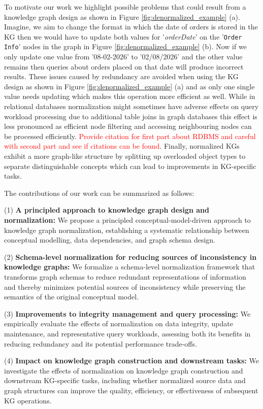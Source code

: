 \documentclass[sigconf]{acmart}
\begin{document}
To motivate our work we highlight possible problems that could result from a knowledge graph design as shown in Figure \ref{fig:denormalized_example} (a). Imagine, we aim to change the format in which the date of orders is stored in the KG then we would have to update both values for '\emph{orderDate}' on the '\texttt{Order Info}' nodes in the graph in Figure \ref{fig:denormalized_example} (b). Now if we only update one value from '08-02-2026' to '02/08/2026' and the other value  remains then queries about orders placed on that date will produce incorrect results. These issues caused by redundancy are avoided when using the KG design as shown in Figure \ref{fig:denormalized_example} (a) and as only one single value needs updating which makes this operation more efficient as well. While in relational databases normalization might sometimes have adverse effects on query workload processing due to additional table joins in graph databases this effect is less pronounced as efficient node filtering and accessing neighbouring nodes can be processed efficiently. \textcolor{red}{Provide citation for first part about RDBMS and careful with second part and see if citations can be found}. Finally, normalized KGs exhibit a more graph-like structure by splitting up overloaded object types to separate distinguishable concepts which can lead to improvements in KG-specific tasks.


The contributions of our work can be summarized as follows:

(1) \textbf{A principled approach to knowledge graph design and normalization:} We propose a principled conceptual-model-driven approach to knowledge graph normalization, establishing a systematic relationship between conceptual modelling, data dependencies, and graph schema design.

(2) \textbf{Schema-level normalization for reducing sources of inconsistency in knowledge graphs:} We formalize a schema-level normalization framework that transforms graph schemas to reduce redundant representations of information and thereby minimizes potential sources of inconsistency while preserving the semantics of the original conceptual model.

(3) \textbf{Improvements to integrity management and query processing:} We empirically evaluate the effects of normalization on data integrity, update maintenance, and representative query workloads, assessing both its benefits in reducing redundancy and its potential performance trade-offs.

(4) \textbf{Impact on knowledge graph construction and downstream tasks:} We investigate the effects of normalization on knowledge graph construction and downstream KG-specific tasks, including whether normalized source data and graph structures can improve the quality, efficiency, or effectiveness of subsequent KG operations.
\end{document}
